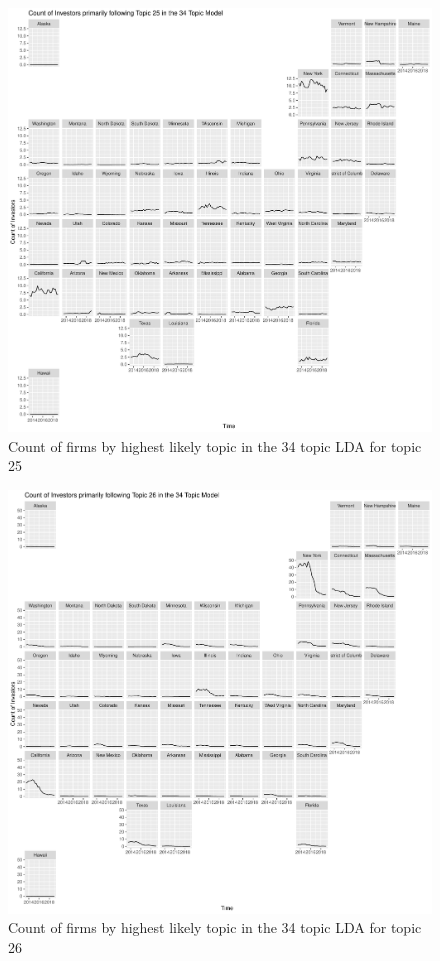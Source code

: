 \begin{figure}
	\centering
	\includegraphics[width=1\linewidth]{Figures/ChapterV/USA_34_Topic25.pdf}
	\caption[Count of Firms for Topic 25 by Quarter]{Count of firms by highest likely topic in the 34 topic LDA for topic 25}
	\label{fig:StateLDA25}
\end{figure}

\begin{figure}
	\centering
	\includegraphics[width=1\linewidth]{Figures/ChapterV/USA_34_Topic26.pdf}
	\caption[Count of Firms for Topic 26 by Quarter]{Count of firms by highest likely topic in the 34 topic LDA for topic 26}
	\label{fig:StateLDA26}
\end{figure}

